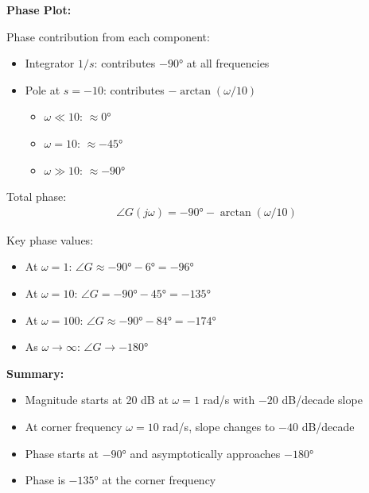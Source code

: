 \documentclass[11pt,a4paper]{article}
\begin{document}
\textbf{Phase Plot:}

Phase contribution from each component:
\begin{itemize}
\item Integrator $1/s$: contributes $-90°$ at all frequencies
\item Pole at $s = -10$: contributes $-\arctan(\omega/10)$
  \begin{itemize}
  \item $\omega \ll 10$: $\approx 0°$
  \item $\omega = 10$: $\approx -45°$
  \item $\omega \gg 10$: $\approx -90°$
  \end{itemize}
\end{itemize}

Total phase:
\begin{align}
\angle G(j\omega) = -90° - \arctan(\omega/10)
\end{align}

Key phase values:
\begin{itemize}
\item At $\omega = 1$: $\angle G \approx -90° - 6° = -96°$
\item At $\omega = 10$: $\angle G = -90° - 45° = -135°$
\item At $\omega = 100$: $\angle G \approx -90° - 84° = -174°$
\item As $\omega \to \infty$: $\angle G \to -180°$
\end{itemize}

\textbf{Summary:}
\begin{itemize}
\item Magnitude starts at 20 dB at $\omega = 1$ rad/s with $-20$ dB/decade slope
\item At corner frequency $\omega = 10$ rad/s, slope changes to $-40$ dB/decade
\item Phase starts at $-90°$ and asymptotically approaches $-180°$
\item Phase is $-135°$ at the corner frequency
\end{itemize}
\end{document}
